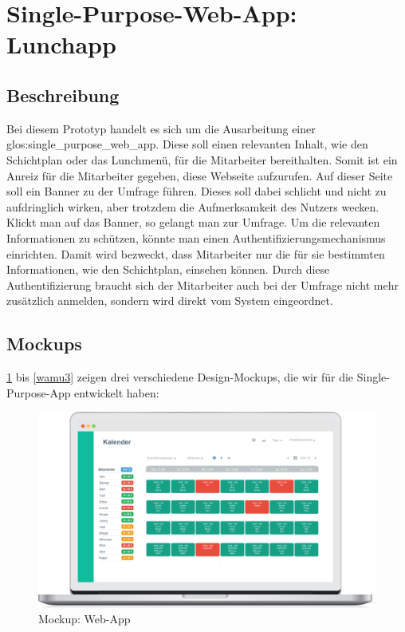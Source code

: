\section{Single-Purpose-Web-App: Lunchapp}
\label{section:lunchapp}

\subsection{Beschreibung}


Bei diesem Prototyp handelt es sich um die Ausarbeitung einer \gls{glos:single_purpose_web_app}. Diese soll einen relevanten Inhalt, wie den Schichtplan oder das Lunchmenü, für die Mitarbeiter bereithalten. Somit ist ein Anreiz für die Mitarbeiter gegeben, diese Webseite aufzurufen. Auf dieser Seite soll ein Banner zu der Umfrage führen. Dieses soll dabei schlicht und nicht zu aufdringlich wirken, aber trotzdem die Aufmerksamkeit des Nutzers wecken. Klickt man auf das Banner, so gelangt man zur Umfrage. Um die relevanten Informationen zu schützen, könnte man einen Authentifizierungsmechanismus einrichten. Damit wird bezweckt, dass Mitarbeiter nur die für sie bestimmten Informationen, wie den Schichtplan, einsehen können. Durch diese Authentifizierung braucht sich der Mitarbeiter auch bei der Umfrage nicht mehr zusätzlich anmelden, sondern wird direkt vom System eingeordnet.

\subsection{Mockups}

\ref{wamu1} bis \ref{wamu3} zeigen drei verschiedene Design-Mockups, die wir für die Single-Purpose-App entwickelt haben:

\begin{figure}[H] 
\centering 
\includegraphics[scale=0.72]{images/lunchapp_mockups/mockup1} 
\caption[Mockup: Web-App]{Mockup: Web-App} 
\label{wamu1} 
\end{figure}


